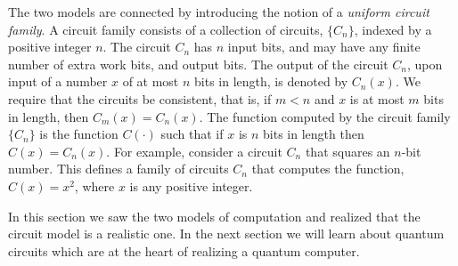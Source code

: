 The two models are connected by introducing the notion of a \textit{uniform circuit family}. A circuit family consists of a collection of circuits, $\{C_n\}$, indexed by a positive integer $n$. The circuit $C_n$ has $n$ input bits, and may have any finite number of extra work bits, and output bits. The output of the circuit $C_n$, upon input of a number $x$ of at most $n$ bits in length, is denoted by $C_n(x)$. We require that the circuits be consistent, that is, if $m \lt n$ and $x$ is at most $m$ bits in length, then $C_m(x) = C_n(x)$. The function computed by the circuit family $\{C_n\}$ is the function $C(\cdot)$ such that if $x$ is $n$ bits in length then $C(x) = C_n(x)$. For example, consider a circuit $C_n$ that squares an $n$-bit number. This defines a family of circuits ${C_n}$ that computes the function, $C(x) = x^2$, where $x$ is any positive integer.
\vspace{1em}

In this section we saw the two models of computation and realized that the circuit model is a realistic one. In the next section we will learn about quantum circuits which are at the heart of realizing a quantum computer.